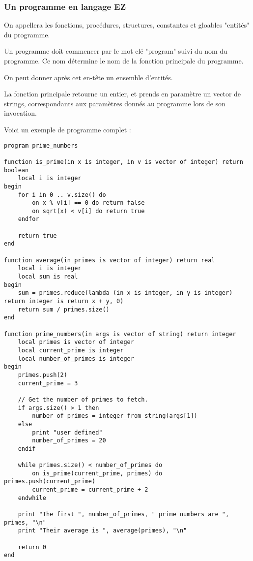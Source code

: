 \subsubsection{Un programme en langage EZ}

On appellera les fonctions, procédures, structures, constantes et gloables
"entités" du programme.

Un programme doit commencer par le mot clé "program" suivi du nom du programme.
Ce nom détermine le nom de la fonction principale du programme.

On peut donner après cet en-tête un ensemble d'entités.

La fonction principale retourne un entier, et prends en paramètre un
vector de strings, correspondants aux paramètres donnés au programme lors
de son invocation.

Voici un exemple de programme complet :
\begin{verbatim}
program prime_numbers

function is_prime(in x is integer, in v is vector of integer) return boolean
    local i is integer
begin
    for i in 0 .. v.size() do
        on x % v[i] == 0 do return false
        on sqrt(x) < v[i] do return true
    endfor

    return true
end

function average(in primes is vector of integer) return real
    local i is integer
    local sum is real
begin
    sum = primes.reduce(lambda (in x is integer, in y is integer) return integer is return x + y, 0)
    return sum / primes.size()
end

function prime_numbers(in args is vector of string) return integer
    local primes is vector of integer
    local current_prime is integer
    local number_of_primes is integer
begin
    primes.push(2)
    current_prime = 3

    // Get the number of primes to fetch.
    if args.size() > 1 then
        number_of_primes = integer_from_string(args[1])
    else
        print "user defined"
        number_of_primes = 20
    endif

    while primes.size() < number_of_primes do
        on is_prime(current_prime, primes) do primes.push(current_prime)
        current_prime = current_prime + 2
    endwhile

    print "The first ", number_of_primes, " prime numbers are ", primes, "\n"
    print "Their average is ", average(primes), "\n"

    return 0
end
\end{verbatim}

